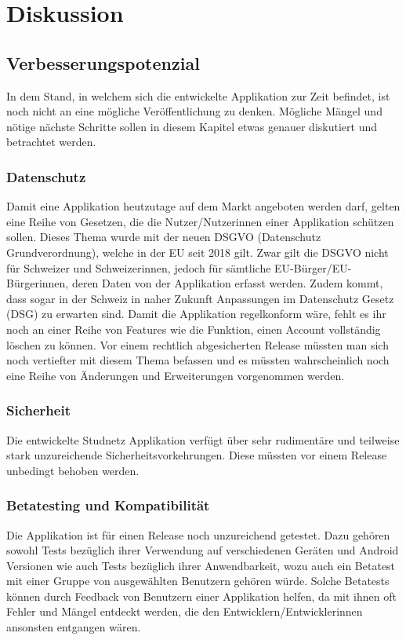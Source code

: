 \documentclass[../main.tex]{subfiles}
\begin{document}
	\chapter{Diskussion}
	
	\section{Verbesserungspotenzial}
	In dem Stand, in welchem sich die entwickelte Applikation zur Zeit befindet, ist noch nicht an eine mögliche Veröffentlichung zu denken. Mögliche Mängel und nötige nächste Schritte sollen in diesem Kapitel etwas genauer diskutiert und betrachtet werden.
	
	\subsection*{Datenschutz}
	Damit eine Applikation heutzutage auf dem Markt angeboten werden darf, gelten eine Reihe von Gesetzen, die die Nutzer/Nutzerinnen einer Applikation schützen sollen.  Dieses Thema wurde mit der neuen DSGVO (Datenschutz Grundverordnung), welche in der EU seit 2018 gilt. Zwar gilt die DSGVO nicht für Schweizer und Schweizerinnen, jedoch für sämtliche EU-Bürger/EU-Bürgerinnen, deren Daten von der Applikation erfasst werden. Zudem kommt, dass sogar in der Schweiz in naher Zukunft Anpassungen im Datenschutz Gesetz (DSG) zu erwarten sind. Damit die Applikation regelkonform wäre, fehlt es ihr noch an einer Reihe von Features wie die Funktion, einen Account vollständig löschen zu können. Vor einem rechtlich abgesicherten Release müssten man sich noch vertiefter mit diesem Thema befassen und es müssten wahrscheinlich noch eine Reihe von Änderungen und Erweiterungen vorgenommen werden.  \cite{dsgvoschweiz}
	
	\subsection*{Sicherheit}
	Die entwickelte Studnetz Applikation verfügt über sehr rudimentäre und teilweise stark unzureichende Sicherheitsvorkehrungen. Diese müssten vor einem Release unbedingt behoben werden.
	
	\subsection*{Betatesting und Kompatibilität}
	Die Applikation ist für einen Release noch unzureichend getestet. Dazu gehören sowohl Tests bezüglich ihrer Verwendung auf verschiedenen Geräten und Android Versionen wie auch Tests bezüglich ihrer Anwendbarkeit, wozu auch ein Betatest mit einer Gruppe von ausgewählten Benutzern gehören würde. Solche Betatests können durch Feedback von Benutzern einer Applikation helfen, da mit ihnen oft Fehler und Mängel entdeckt werden, die den Entwicklern/Entwicklerinnen ansonsten entgangen wären.
	
\end{document}
